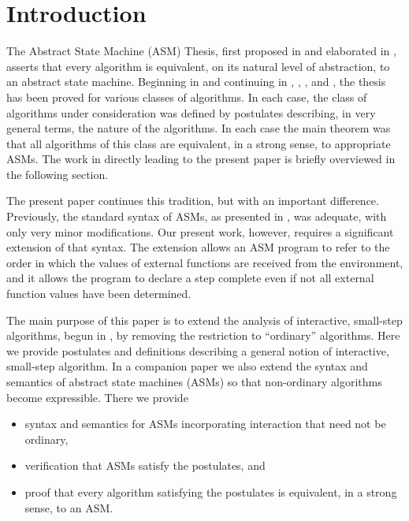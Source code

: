 \documentclass{LMCS}
\theoremstyle{definition}
\newenvironment{ls}{\begin{itemize}}{\end{itemize}}
\begin{document}
\maketitle



\section{Introduction}\label{intro}

The Abstract State Machine (ASM) Thesis, first proposed in
\cite{thesis} and elaborated in \cite{tutorial,lipari}, asserts that
every algorithm is equivalent, on its natural level of abstraction, to
an abstract state machine.  Beginning in \cite{seqth} and continuing
in \cite{parth}, \cite{oa1}, \cite{oa2}, and \cite{oa3}, the thesis
has been proved for various classes of algorithms.  In each case, the
class of algorithms under consideration was defined by postulates
describing, in very general terms, the nature of the algorithms. In
each case the main theorem was that all algorithms of this class are
equivalent, in a strong sense, to appropriate ASMs. The work in
\cite{seqth,oa1,oa2,oa3} directly leading to the present paper is
briefly overviewed in the following section.

The present paper continues this tradition, but with an important
difference.  Previously, the standard syntax of ASMs, as presented in
\cite{lipari}, was adequate, with only very minor modifications.  Our
present work, however, requires a significant extension of that
syntax.  The extension allows an ASM program to refer to the order in
which the values of external functions are received from the
environment, and it allows the program to declare a step complete even
if not all external function values have been determined.

The main purpose of this paper is to extend the analysis of
interactive, small-step algorithms, begun in \cite{oa1, oa2, oa3}, by
removing the restriction to ``ordinary'' algorithms.  Here we provide
postulates and definitions describing a general notion of interactive,
small-step algorithm.  In a companion paper \cite{ga2} we also extend
the syntax and semantics of abstract state machines (ASMs) so that
non-ordinary algorithms become expressible. There we provide
\begin{ls}
  \item syntax and semantics for ASMs incorporating interaction that
  need not be ordinary,
  \item verification that ASMs satisfy the postulates, and
  \item proof that every algorithm satisfying the postulates is
  equivalent, in a strong sense, to an ASM.
\end{ls}
\end{document}
